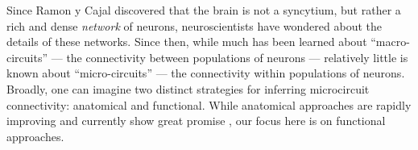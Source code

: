 Since Ramon y Cajal discovered that the brain is not a syncytium, but rather a rich and dense \emph{network} of neurons, neuroscientists have wondered about the details of these networks.  Since then, while much has been learned about ``macro-circuits''  --- the connectivity between populations of neurons --- relatively little is known about ``micro-circuits'' --- the connectivity within populations of neurons. Broadly, one can imagine two distinct strategies for inferring microcircuit connectivity: anatomical and functional.  While anatomical approaches are rapidly improving and currently show great promise \cite{??}, our focus here is on functional approaches.


